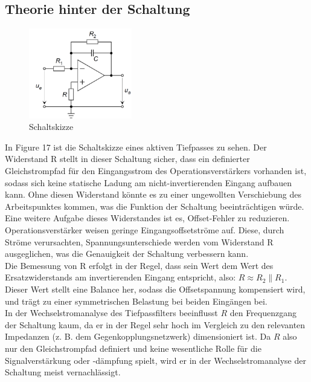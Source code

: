 \documentclass[a4paper,12pt]{article}
\begin{document}
\subsection{Theorie hinter der Schaltung}
\begin{figure}[H]
    \centering
    \includegraphics[width=0.4\textwidth]{../Quellen/Labor2/Versuch 6/Schaltungsplan.png}
\caption{Schaltskizze}
\end{figure}
In Figure 17 ist die Schaltskizze eines aktiven Tiefpasses zu sehen. Der Widerstand R stellt in dieser Schaltung sicher, dass ein definierter Gleichstrompfad für den Eingangsstrom des Operationsverstärkers vorhanden ist, sodass sich keine statische Ladung am nicht-invertierenden Eingang aufbauen kann. Ohne diesen Widerstand könnte es zu einer ungewollten Verschiebung des Arbeitspunktes kommen, was die Funktion der Schaltung beeinträchtigen würde. Eine weitere Aufgabe dieses Widerstandes ist es, Offset-Fehler zu reduzieren. Operationsverstärker weisen geringe Eingangsoffsetströme auf. Diese, durch Ströme verursachten, Spannungsunterschiede werden vom Widerstand R ausgeglichen, was die Genauigkeit der Schaltung verbessern kann.\\
Die Bemessung von R erfolgt in der Regel, dass sein Wert dem Wert des Ersatzwiderstands am invertierenden Eingang entspricht, also: \(
R \approx R_2 \parallel R_1\).\\
Dieser Wert stellt eine Balance her, sodass die Offsetspannung kompensiert wird, und trägt zu einer symmetrischen Belastung bei beiden Eingängen bei.\\
In der Wechselstromanalyse des Tiefpassfilters beeinflusst $R$ den Frequenzgang der Schaltung kaum, da er in der Regel sehr hoch im Vergleich zu den relevanten Impedanzen (z. B. dem Gegenkopplungsnetzwerk) dimensioniert ist. Da $R$ also nur den Gleichstrompfad definiert und keine wesentliche Rolle für die Signalverstärkung oder -dämpfung spielt, wird er in der Wechselstromanalyse der Schaltung meist vernachlässigt.
\end{document}
